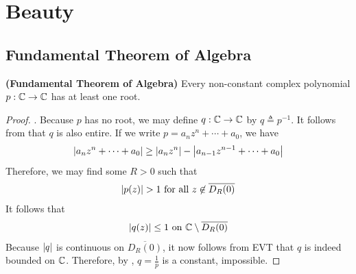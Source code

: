 \documentclass{report}
\begin{document}
\chapter{Beauty}
\label{Beauty}
\section{Fundamental Theorem of Algebra}
\begin{theorem}
\textbf{(Fundamental Theorem of Algebra)} Every non-constant complex polynomial $p:\mathbb{C}\rightarrow \mathbb{C}$ has at least one root. 
\end{theorem}
\begin{proof}
. Because $p$ has no root, we may define  $q:\mathbb{C}\rightarrow \mathbb{C}$ by $q\triangleq p^{-1}$. It follows from  that $q$ is also entire. If we write $p=a_nz^n+ \cdots + a_0$, we have 
\begin{align*}
\left|a_nz^n+ \cdots +a_0\right|\geq \left|a_nz^n\right|- \left|a_{n-1}z^{n-1}+ \cdots + a_0\right|
\end{align*}
Therefore, we may find some $R>0$ such that 
\begin{align*}
\abso{p(z)}>1 \text{ for all }z\not\in  \overline{D_R(0)}
\end{align*}
It follows that 
\begin{align*}
\left|q(z)\right|\leq 1\text{ on }\mathbb{C} \setminus \overline{D_R(0)}
\end{align*}
Because $\left|q\right|$ is continuous on $\overline{D_R(0)}$, it now follows from EVT that $q$ is indeed bounded on $\mathbb{C}$. Therefore, by , $q=\frac{1}{p}$ is a constant, impossible. \CaC
\end{proof}
\end{document}
